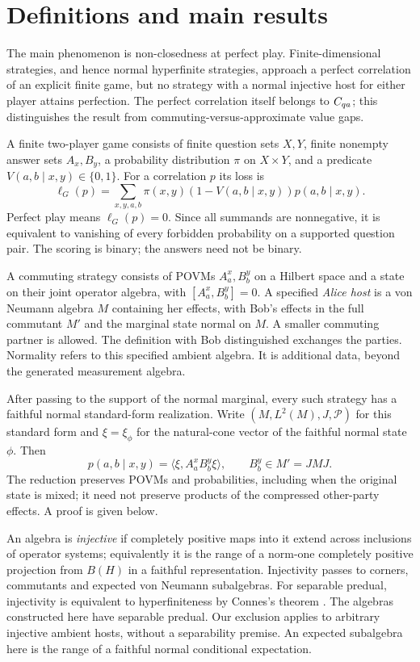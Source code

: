 \section{Definitions and main results}\label{sec:definitions}
The main phenomenon is non-closedness at perfect play. Finite-dimensional strategies, and hence normal hyperfinite strategies, approach a perfect correlation of an explicit finite game, but no strategy with a normal injective host for either player attains perfection. The perfect correlation itself belongs to $C_{qa}$; this distinguishes the result from commuting-versus-approximate value gaps.

A finite two-player game consists of finite question sets $X,Y$, finite nonempty answer sets $A_x,B_y$, a probability distribution $\pi$ on $X\times Y$, and a predicate $V(a,b\mid x,y)\in\{0,1\}$. For a correlation $p$ its loss is
\[
 \ell_G(p)=\sum_{x,y,a,b}\pi(x,y)(1-V(a,b\mid x,y))p(a,b\mid x,y).
\]
Perfect play means $\ell_G(p)=0$. Since all summands are nonnegative, it is equivalent to vanishing of every forbidden probability on a supported question pair. The scoring is binary; the answers need not be binary.

A commuting strategy consists of POVMs $A_a^x,B_b^y$ on a Hilbert space and a state on their joint operator algebra, with $[A_a^x,B_b^y]=0$. A specified \emph{Alice host} is a von Neumann algebra $M$ containing her effects, with Bob's effects in the full commutant $M'$ and the marginal state normal on $M$. A smaller commuting partner is allowed. The definition with Bob distinguished exchanges the parties. Normality refers to this specified ambient algebra. It is additional data, beyond the generated measurement algebra.

After passing to the support of the normal marginal, every such strategy has a faithful normal standard-form realization. Write $(M,L^2(M),J,\mathcal P)$ for this standard form and $\xi=\xi_\phi$ for the natural-cone vector of the faithful normal state $\phi$. Then
\[
 p(a,b\mid x,y)=\langle\xi,A_a^xB_b^y\xi\rangle,\qquad B_b^y\in M'=JMJ.
\]
The reduction preserves POVMs and probabilities, including when the original state is mixed; it need not preserve products of the compressed other-party effects. A proof is given below.

An algebra is \emph{injective} if completely positive maps into it extend across inclusions of operator systems; equivalently it is the range of a norm-one completely positive projection from $B(H)$ in a faithful representation. Injectivity passes to corners, commutants and expected von Neumann subalgebras. For separable predual, injectivity is equivalent to hyperfiniteness by Connes's theorem \cite{Connes76}. The algebras constructed here have separable predual. Our exclusion applies to arbitrary injective ambient hosts, without a separability premise. An expected subalgebra here is the range of a faithful normal conditional expectation.

